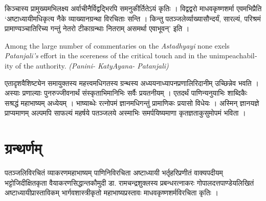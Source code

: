 {किञ्चास्य प्रामुख्यमभिलक्ष्य अर्वाचीनैर्विद्वद्भिरपि समनुकीर्तितेऽयं कृतिः । विद्वद्वरो माधवकृष्णशर्मा एवमभिप्रैति ‘अष्टाध्यायीमधिकृत्य नैके व्याख्यानग्रन्था विरचिताः सन्ति । किन्तु पतञ्जलेर्व्याख्यासौन्दर्यं, सारल्यं, परिश्रमं प्रामाण्यञ्चातिरिच्य गन्तुं नेतरो टीकाग्रन्थाः नितराम् असमर्था एवाभूवन्’ इति ।
\begin{english}
Among the large number of commentaries on the \textit{Astadhyayi} none exels \textit{Patanjali’s} effort in the scereness of the critical touch and in the unimpeachability of the authority. \textit{(Panini- KatyAyana- Patanjali)}
\end{english}

एतादृशवैशिष्ट्येन समायुक्तस्य महत्त्वमधिगतस्य ग्रन्थस्य अध्ययनाध्यापनप्रणालिरिदानीम् उच्छिन्नेव भवति । अस्याः प्रणाल्याः पुनरुज्जीवनार्थं संस्कृताभिमानिभिः सर्वैः प्रयतनीयम् । एतदर्थं पाणिन्यनुयाभिः शाब्दिकैः सश्रद्धं महाभाष्यम् अध्येयम् । भाष्याब्धेः रत्नोपमं ज्ञानमधिगन्तुं प्रामाणिकः प्रयासो विधेयः । अस्मिन् ज्ञानयज्ञे प्राप्यमाणम् अल्पमपि साफल्यं महर्षये पतञ्जलये अस्माभिः समर्पयिष्यमाणा कृतज्ञताकुसुमोपमं भविता ।

\section*{ग्रन्थर्णम्}

\begin{thebibliography}{99}
 पतञ्जलिविरचितं व्याकरणमहाभाष्यम्
 पाणिनिविरचिता अष्टाध्यायी
 भर्तृहरिप्रणीतं वाक्यपदीयम्
 भट्टोजिदीक्षितकृता वैयाकरणसिद्धान्तकौमुदी
 डा. रामचन्द्रशुक्लस्य प्रबन्धरत्नाकरः
 गोपालदत्तपाण्डेयलिखितं अष्टाध्यायीप्रास्ताविकम्
 भार्गवशास्त्रीकृतो महाभाष्यप्रस्तावः
 माधवकृष्णशर्मविरचिता  कृतिः ।
\end{thebibliography}
\articleend
}
